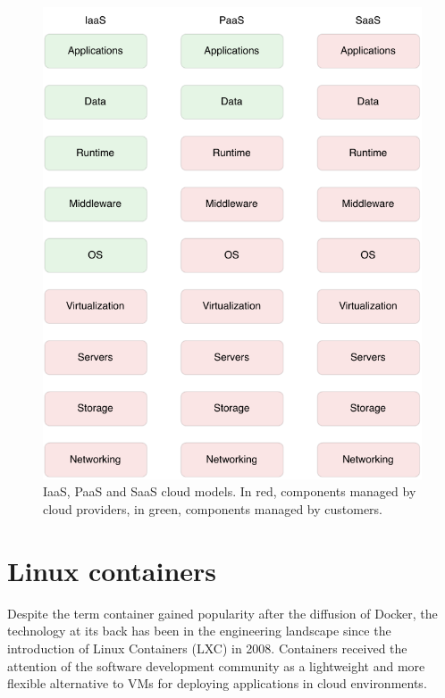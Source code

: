 \begin{figure}[htbp]
    \vspace{10pt}
    \centering
    \includegraphics{assets/iaas_paas_saas.pdf}
    \caption{IaaS, PaaS and SaaS cloud models. In red, components managed by cloud providers, in green, components managed by customers.}
    \label{fig:iaas_paas_saas}
    \vspace{10pt}
\end{figure}
 
\section{Linux containers}
Despite the term container gained popularity after the diffusion of Docker, the technology at its back has been in the engineering landscape since the introduction of Linux Containers (LXC) \cite{LinuxContainers} in 2008. Containers received the attention of the software development community as a lightweight and more flexible alternative to VMs for deploying applications in cloud environments.


